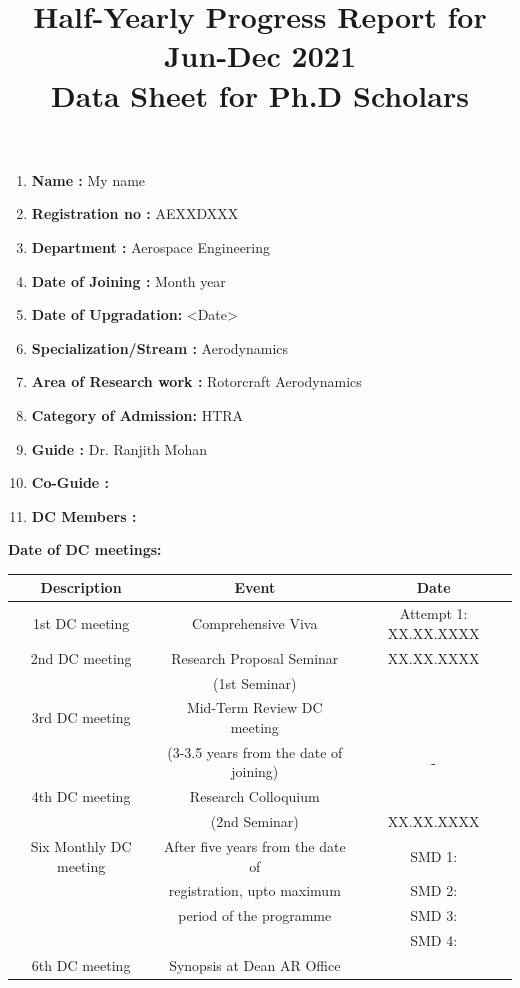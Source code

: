 \documentclass[11pt]{article}
\title{\textbf{Half-Yearly Progress Report for Jun-Dec 2021\\Data Sheet for Ph.D Scholars}}
\date{}
\author{}
\begin{document}
\maketitle
\begin{enumerate}[]
	\setlength\itemsep{0.5em}
	\item \textbf{Name             :} My name
	\item \textbf{Registration no  :} AEXXDXXX
	\item \textbf{Department       :} Aerospace Engineering
	\item \textbf{Date of Joining  :} Month year
	\item \textbf{Date of Upgradation:} <Date>
	\item \textbf{Specialization/Stream  :} Aerodynamics
	\item \textbf{Area of Research work :} Rotorcraft Aerodynamics
	\item \textbf{Category of Admission:} HTRA
	\item \textbf{Guide            :} Dr. Ranjith Mohan 
	\item \textbf{Co-Guide         :} 
	\item \textbf{DC Members       :}
\end{enumerate} 

\noindent\textbf{Date of DC meetings:}
\begin{table}[h]
\centering
\begin{tabular}{|c|c|c|} \hline
\textbf{Description}    & \textbf{Event} & \textbf{Date} \\ \hline
1st DC meeting & Comprehensive Viva & Attempt 1: XX.XX.XXXX \\ \hline
2nd DC meeting & Research Proposal Seminar & XX.XX.XXXX	     \\
               & (1st Seminar) & \\ \hline
3rd DC meeting & Mid-Term Review DC meeting &      \\
               & (3-3.5 years from the date of joining) & - \\ \hline
4th DC meeting & Research Colloquium &      \\
               & (2nd Seminar) & XX.XX.XXXX \\ \hline
Six Monthly DC meeting & After five years from the date of & SMD 1: \\
               & registration, upto maximum & SMD 2: \\
               & period of the programme    & SMD 3: \\ 
               &                            & SMD 4: \\ \hline
6th DC meeting & Synopsis at Dean AR Office      &     \\ \hline
\end{tabular}
\end{table}
\end{document}
